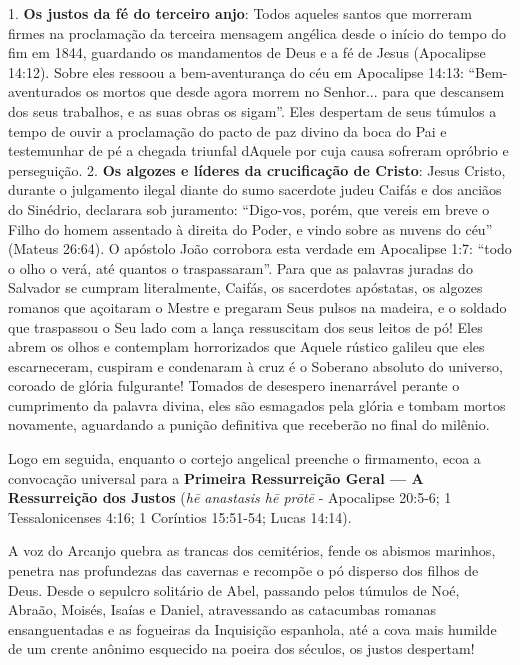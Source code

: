 \documentclass[11pt,a4paper,openany]{book}
\begin{document}
1. \textbf{Os justos da fé do terceiro anjo}: Todos aqueles santos que morreram firmes na proclamação da terceira mensagem angélica desde o início do tempo do fim em 1844, guardando os mandamentos de Deus e a fé de Jesus (Apocalipse 14:12). Sobre eles ressoou a bem-aventurança do céu em Apocalipse 14:13: ``Bem-aventurados os mortos que desde agora morrem no Senhor... para que descansem dos seus trabalhos, e as suas obras os sigam''. Eles despertam de seus túmulos a tempo de ouvir a proclamação do pacto de paz divino da boca do Pai e testemunhar de pé a chegada triunfal dAquele por cuja causa sofreram opróbrio e perseguição.
2. \textbf{Os algozes e líderes da crucificação de Cristo}: Jesus Cristo, durante o julgamento ilegal diante do sumo sacerdote judeu Caifás e dos anciãos do Sinédrio, declarara sob juramento: ``Digo-vos, porém, que vereis em breve o Filho do homem assentado à direita do Poder, e vindo sobre as nuvens do céu'' (Mateus 26:64). O apóstolo João corrobora esta verdade em Apocalipse 1:7: ``todo o olho o verá, até quantos o traspassaram''. Para que as palavras juradas do Salvador se cumpram literalmente, Caifás, os sacerdotes apóstatas, os algozes romanos que açoitaram o Mestre e pregaram Seus pulsos na madeira, e o soldado que traspassou o Seu lado com a lança ressuscitam dos seus leitos de pó! Eles abrem os olhos e contemplam horrorizados que Aquele rústico galileu que eles escarneceram, cuspiram e condenaram à cruz é o Soberano absoluto do universo, coroado de glória fulgurante! Tomados de desespero inenarrável perante o cumprimento da palavra divina, eles são esmagados pela glória e tombam mortos novamente, aguardando a punição definitiva que receberão no final do milênio.

Logo em seguida, enquanto o cortejo angelical preenche o firmamento, ecoa a convocação universal para a \textbf{Primeira Ressurreição Geral — A Ressurreição dos Justos} (\textit{hē anastasis hē prōtē} - Apocalipse 20:5-6; 1 Tessalonicenses 4:16; 1 Coríntios 15:51-54; Lucas 14:14).

A voz do Arcanjo quebra as trancas dos cemitérios, fende os abismos marinhos, penetra nas profundezas das cavernas e recompõe o pó disperso dos filhos de Deus. Desde o sepulcro solitário de Abel, passando pelos túmulos de Noé, Abraão, Moisés, Isaías e Daniel, atravessando as catacumbas romanas ensanguentadas e as fogueiras da Inquisição espanhola, até a cova mais humilde de um crente anônimo esquecido na poeira dos séculos, os justos despertam!
\end{document}
